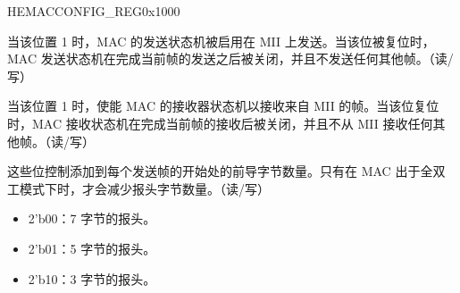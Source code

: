 \addtocounter{Regfloat}{-1}
\begin{register}{H}{EMACCONFIG\_REG}{0x1000}
\begin{regdesc}\begin{reglist}
\item[继上一页寄存器描述。]

\item [EMACTX]当该位置 1 时，MAC 的发送状态机被启用在 MII 上发送。当该位被复位时，MAC 发送状态机在完成当前帧的发送之后被关闭，并且不发送任何其他帧。（读/写）
\item [EMACRX]当该位置 1 时，使能 MAC 的接收器状态机以接收来自 MII 的帧。当该位复位时，MAC 接收状态机在完成当前帧的接收后被关闭，并且不从 MII 接收任何其他帧。（读/写）
\item [PLTF] 这些位控制添加到每个发送帧的开始处的前导字节数量。只有在 MAC 出于全双工模式下时，才会减少报头字节数量。（读/写）\begin{itemize}
\item 2'b00：7 字节的报头。\item 2'b01：5 字节的报头。\item 2'b10：3 字节的报头。\end{itemize}
\end{reglist}\end{regdesc}
\end{register}


